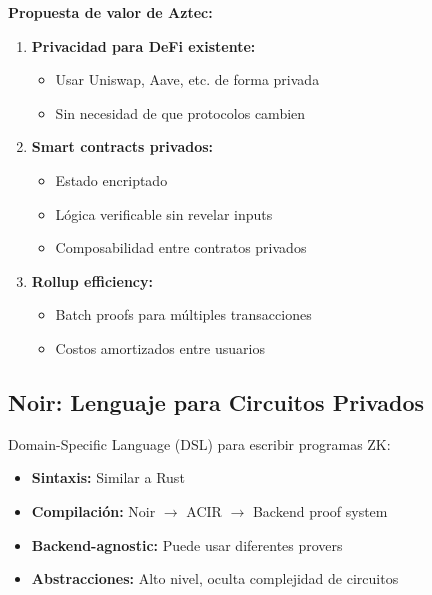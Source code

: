 \documentclass[11pt,a4paper,twoside]{book}
\begin{document}
\begin{keyidea}
\textbf{Propuesta de valor de Aztec:}

\begin{enumerate}
    \item \textbf{Privacidad para DeFi existente:}
    \begin{itemize}
        \item Usar Uniswap, Aave, etc. de forma privada
        \item Sin necesidad de que protocolos cambien
    \end{itemize}
    
    \item \textbf{Smart contracts privados:}
    \begin{itemize}
        \item Estado encriptado
        \item L\'ogica verificable sin revelar inputs
        \item Composabilidad entre contratos privados
    \end{itemize}
    
    \item \textbf{Rollup efficiency:}
    \begin{itemize}
        \item Batch proofs para m\'ultiples transacciones
        \item Costos amortizados entre usuarios
    \end{itemize}
\end{enumerate}
\end{keyidea}

\subsection{Noir: Lenguaje para Circuitos Privados}

\begin{definition}[Noir]
Domain-Specific Language (DSL) para escribir programas ZK:
\begin{itemize}
    \item \textbf{Sintaxis:} Similar a Rust
    \item \textbf{Compilaci\'on:} Noir $\to$ ACIR $\to$ Backend proof system
    \item \textbf{Backend-agnostic:} Puede usar diferentes provers
    \item \textbf{Abstracciones:} Alto nivel, oculta complejidad de circuitos
\end{itemize}
\end{definition}
\end{document}
